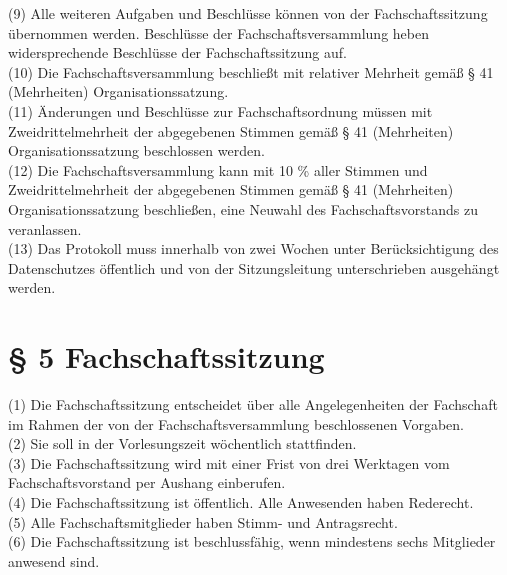 \documentclass[a4paper, parskip=half, numbers=noenddot]{scrartcl}
\begin{document}
(9) Alle weiteren Aufgaben und Beschlüsse können von der Fachschaftssitzung übernommen werden. Beschlüsse der Fachschaftsversammlung heben widersprechende Beschlüsse der Fachschaftssitzung auf.\\

(10) Die Fachschaftsversammlung beschließt mit relativer Mehrheit gemäß § 41 (Mehrheiten) Organisationssatzung.\\

(11) Änderungen und Beschlüsse zur Fachschaftsordnung müssen mit Zweidrittelmehrheit der abgegebenen Stimmen gemäß § 41 (Mehrheiten) Organisationssatzung beschlossen werden.\\

(12) Die Fachschaftsversammlung kann mit 10 \% aller Stimmen und Zweidrittelmehrheit der abgegebenen Stimmen gemäß § 41 (Mehrheiten) Organisationssatzung beschließen, eine Neuwahl des Fachschaftsvorstands zu veranlassen.\\

(13) Das Protokoll muss innerhalb von zwei Wochen unter Berücksichtigung des Datenschutzes öffentlich und von der Sitzungsleitung unterschrieben ausgehängt werden.\\


%
%

\section*{§ 5 Fachschaftssitzung}

(1) Die Fachschaftssitzung entscheidet über alle Angelegenheiten der Fachschaft im Rahmen der von der Fachschaftsversammlung beschlossenen Vorgaben.\\

(2) Sie soll in der Vorlesungszeit wöchentlich stattfinden.\\

(3) Die Fachschaftssitzung wird mit einer Frist von drei Werktagen vom Fachschaftsvorstand per Aushang einberufen.\\

(4) Die Fachschaftssitzung ist öffentlich. Alle Anwesenden haben Rederecht.\\

(5) Alle Fachschaftsmitglieder haben Stimm- und Antragsrecht.\\

(6) Die Fachschaftssitzung ist beschlussfähig, wenn mindestens sechs Mitglieder anwesend sind.\\
\end{document}
